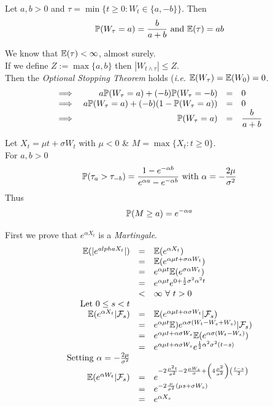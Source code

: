 \documentclass[11pt,a4paper]{article}
\begin{document}
Let $a,b>0$ and $\tau=\min\{t\geq0:W_t\in\{a,-b\}\}$. Then
$$\prob(W_\tau=a)=\frac{b}{a+b}\ \mathrm{and}\ \expect(\tau)=ab$$

We know that $\mathbb{E}(\tau)<\infty$, almost surely.\\
If we define $Z:=\max\{a,b\}$ then $|W_{t\wedge\tau}|\leq Z$.\\
Then the \textit{Optional Stopping Theorem} holds (\textit{i.e.} $\mathbb{E}(W_\tau)=\mathbb{E}(W_0)=0$.
\[\begin{array}{rrcl}
\implies&a\mathbb{P}(W_\tau=a)+(-b)\mathbb{P}(W_\tau=-b)&=&0\\
\implies&a\mathbb{P}(W_\tau=a)+(-b)(1-\mathbb{P}(W_\tau=a))&=&0\\
\implies&\mathbb{P}(W_\tau=a)&=&\dfrac{b}{a+b}
\end{array}\]

Let $X_t=\mu t+\sigma W_t$ with $\mu<0$ \& $M=\max\{X_t:t\geq0\}$.\\
For $a,b>0$
$$\prob(\tau_a>\tau_{-b})=\frac{1-e^{-\alpha b}}{e^{\alpha a}-e^{-\alpha b}}\ \mathrm{with}\ \alpha=-\frac{2\mu}{\sigma^2}$$
Thus
$$\mathbb{P}(M\geq a)=e^{-\alpha a}$$

First we prove that $e^{\alpha X_t}$ is a \textit{Martingale}.
\[\begin{array}{rcl}
\mathbb{E}(|e^{alpha X_t}|)&=&\mathbb{E}(e^{\alpha X_t})\\
&=&\mathbb{E}(e^{\alpha\mu t+\sigma\alpha W_t})\\
&=&e^{\alpha\mu t}\mathbb{E}(e^{\sigma\alpha W_t})\\
&=&e^{\alpha\mu t}e^{0+\frac{1}{2}\sigma^2\alpha^2t}\\
&<&\infty\ \forall\ t>0\\
\mathrm{Let\ }0\leq s<t\\
\mathbb{E}(e^{\alpha X_t}|\mathcal{F}_s)&=&\mathbb{E}(e^{\alpha\mu t+\alpha\sigma W_t}|\mathcal{F}_s)\\
&=&e^{\alpha\mu t}\mathbb{E})e^{\alpha\sigma(W_t-W_s+W_s)}|\mathcal{F}_s)\\
&=&e^{\alpha\mu t+\alpha\sigma W_s}\mathbb{E}(e^{\alpha\sigma(W_t-W_s)})\\
&=&e^{\alpha\mu t+\alpha\sigma W_s}e^{\frac{1}{2}\alpha^2\sigma^2(t-s)}\\
\mathrm{Setting}\ \alpha=-\frac{2\mu}{\sigma^2}\\
\mathbb{E}(e^{\alpha W_t}|\mathcal{F}_s)&=&e^{-2\frac{\mu^2t}{\sigma^2}-2\frac{\mu W_s}{\sigma}+\left(4\frac{\mu^2}{\sigma^2}\right)\left(\frac{t-s}{2}\right)}\\
&=&e^{-2\frac{\mu}{\sigma^2}(\mu s+\sigma W_s)}\\
&=&e^{\alpha X_s}
\end{array}\]
\end{document}
